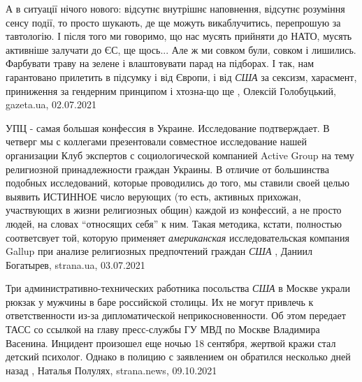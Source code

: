 А в ситуації нічого нового: відсутнє внутрішнє наповнення, відсутнє розуміння
сенсу події, то просто шукають, де ще можуть викаблучитись, перепрошую за
тавтологію.  І після того ми говоримо, що нас мусять прийняти до НАТО, мусять
активніше залучати до ЄС, ще щось... Але ж ми совком були, совком і лишились.
Фарбувати траву на зелене і влаштовувати парад на підборах.  І так, нам
гарантовано прилетить в підсумку і від Європи, і від \emph{США} за сексизм,
харасмент, приниження за гендерним принципом і хтозна-що ще
, 
Олексій Голобуцький, gazeta.ua, 02.07.2021

УПЦ - самая большая конфессия в Украине. Исследование подтверждает.
В четверг мы с коллегами презентовали совместное исследование нашей организации
Клуб экспертов с социологической компанией Active Group на тему религиозной
принадлежности граждан Украины. В отличие от большинства подобных исследований,
которые проводились до того, мы ставили своей целью выявить ИСТИННОЕ число
верующих (то есть, активных прихожан, участвующих в жизни религиозных общин)
каждой из конфессий, а не просто людей, на словах \enquote{относящих себя} к ним. Такая
методика, кстати, полностью соответсвует той, которую применяет \emph{американская}
исследовательская компания Gallup при анализе религиозных предпочтений граждан
\emph{США}
, 
Даниил Богатырев, strana.ua, 03.07.2021

Три административно-технических работника посольства \emph{США} в Москве украли рюкзак
у мужчины в баре российской столицы. Их не могут привлечь к ответственности
из-за дипломатической неприкосновенности.  Об этом передает ТАСС со ссылкой на
главу пресс-службы ГУ МВД по Москве Владимира Васенина.  Инцидент произошел еще
ночью 18 сентября, жертвой кражи стал детский психолог.  Однако в полицию с
заявлением он обратился несколько дней назад
, 
Наталья Полулях, strana.news, 09.10.2021

